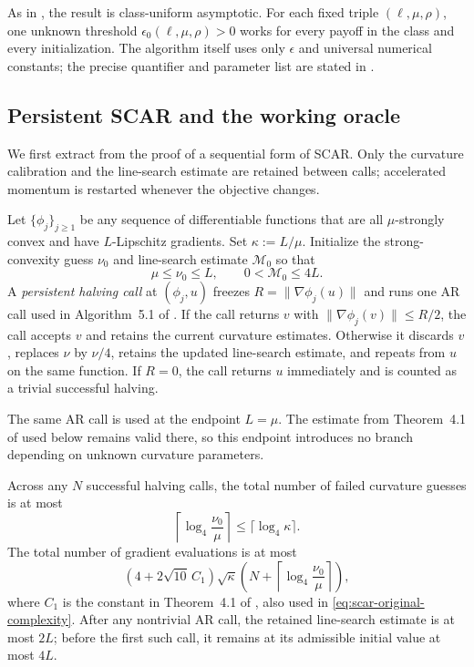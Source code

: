 \documentclass{article}
\begin{document}
As in , the result is class-uniform asymptotic.
For each fixed triple $(\ell,\mu,\rho)$, one unknown threshold
$\epsilon_0(\ell,\mu,\rho)>0$ works for every payoff in the class and
every initialization.  The algorithm itself uses only $\epsilon$ and
universal numerical constants; the precise quantifier and parameter
list are stated in .

\subsection{Persistent SCAR and the working oracle}

We first extract from the proof of  a
sequential form of SCAR.  Only the curvature calibration and the
line-search estimate are retained between calls; accelerated momentum
is restarted whenever the objective changes.

\begin{lemma}
\label{lem:scar-persistent-half}
Let $\{\phi_j\}_{j\ge1}$ be any sequence of differentiable functions
that are all $\mu$-strongly convex and have $L$-Lipschitz gradients.
Set $\kappa:=L/\mu$.
Initialize the strong-convexity guess $\nu_0$ and line-search estimate
$\mathcal M_0$ so that
\[
 \mu\le\nu_0\le L,
 \qquad 0<\mathcal M_0\le4L.
\]
A \emph{persistent halving call} at $(\phi_j,u)$ freezes
$R=\|\nabla\phi_j(u)\|$ and runs one AR call used in Algorithm~5.1 of
\citet{lan2026optimal}.  If the call returns $v$ with
$\|\nabla\phi_j(v)\|\le R/2$, the call accepts $v$ and retains the
current curvature estimates.  Otherwise it discards $v$, replaces
$\nu$ by $\nu/4$, retains the updated line-search estimate, and repeats
from $u$ on the same function.
If $R=0$, the call returns $u$ immediately and is counted as a trivial
successful halving.

The same AR call is used at the endpoint $L=\mu$.  The estimate from
Theorem~4.1 of \citet{lan2026optimal} used below remains valid there,
so this endpoint introduces no branch depending on unknown curvature
parameters.

Across any $N$ successful halving calls, the total number of failed
curvature guesses is at most
\begin{equation}\label{eq:persistent-scar-failures}
 \left\lceil\log_4\frac{\nu_0}{\mu}\right\rceil
 \le\lceil\log_4\kappa\rceil.
\end{equation}
The total number of gradient evaluations is at most
\begin{equation}\label{eq:persistent-scar-count}
 (4+2\sqrt{10}\,C_1)\sqrt\kappa
 \left(
  N+\left\lceil\log_4\frac{\nu_0}{\mu}\right\rceil
 \right),
\end{equation}
where $C_1$ is the constant in Theorem~4.1 of
\citet{lan2026optimal}, also used in
\eqref{eq:scar-original-complexity}.  After any nontrivial AR call, the
retained line-search estimate is at most $2L$; before the first such
call, it remains at its admissible initial value at most $4L$.
\end{lemma}
\end{document}
